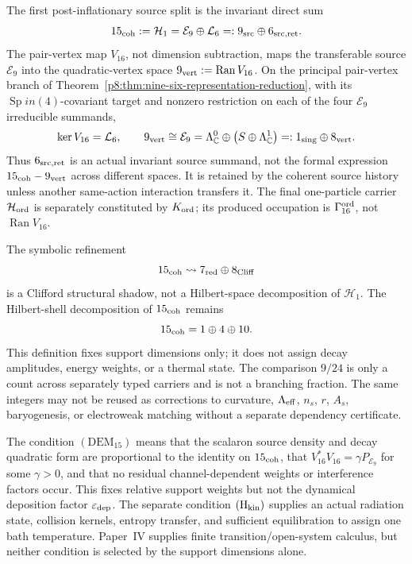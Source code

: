 \documentclass[12pt,a4paper]{article}
\begin{document}
\begin{definition}
\label{p8:def:typed-first-split-carrier}
The first post-inflationary source split is the invariant direct sum
\begin{equation}
 \label{p8:eq:typed-first-split-carrier}
 15_{\rm coh}:=\mathcal H_1
 =\mathcal E_9\oplus\mathcal L_6
 =:9_{\rm src}\oplus6_{\rm src,ret}.
\end{equation}
The pair-vertex map \(V_{16}\), not dimension subtraction, maps the
transferable source \(\mathcal E_9\) into the quadratic-vertex space
\(9_{\rm vert}:=\operatorname{Ran}V_{16}\).  On the principal pair-vertex branch of
Theorem~\ref{p8:thm:nine-six-representation-reduction}, with its
\(\operatorname{Sp}in(4)\)-covariant target and nonzero restriction
on each of the four \(\mathcal E_9\) irreducible summands,
\[
 \ker V_{16}=\mathcal L_6,
 \qquad
 9_{\rm vert}\cong\mathcal E_9
 =\Lambda^0_{\mathbb C}\oplus
   \bigl(S\oplus\Lambda^1_{\mathbb C}\bigr)
 =:1_{\rm sing}\oplus8_{\rm vert}.
\]
Thus \(6_{\rm src,ret}\) is an actual invariant source summand, not the
formal expression \(15_{\rm coh}-9_{\rm vert}\) across different spaces.  It
is retained by the coherent source history unless another same-action
interaction transfers it.
The final one-particle carrier \(\mathcal H_{\rm ord}\) is separately
constituted by \(K_{\rm ord}\); its produced occupation is
\(\Gamma_{16}^{\rm ord}\), not \(\operatorname{Ran}V_{16}\).

The symbolic refinement
\[
15_{\rm coh}\leadsto 7_{\rm red}\oplus8_{\rm Cliff}
\]
is a Clifford structural shadow, not a Hilbert-space decomposition of
\(\mathcal H_1\).  The Hilbert-shell decomposition of \(15_{\rm coh}\) remains
\[
15_{\rm coh}=1\oplus4\oplus10.
\]
This definition fixes support dimensions only; it does not assign decay
amplitudes, energy weights, or a thermal state.  The comparison \(9/24\) is
only a count across separately typed carriers and is not a branching fraction.
The same
integers may not be reused as corrections to curvature, \(\Lambda_{\rm eff}\),
\(n_s\), \(r\), \(A_s\), baryogenesis, or electroweak matching without a
separate dependency certificate.
\end{definition}

\begin{definition}
\label{p8:def:first-split-democratic-kinetic-interfaces}
The condition \((\mathrm{DEM}_{15})\) means that the scalaron source density
and decay quadratic form are proportional to the identity on
\(15_{\rm coh}\), that
\(V_{16}^*V_{16}=\gamma P_{\mathcal E_9}\) for some \(\gamma>0\), and that
no residual channel-dependent weights or interference factors occur.  This
fixes relative support weights but not the dynamical deposition factor
\(\varepsilon_{\rm dep}\).  The separate
condition \((\mathrm H_{\rm kin})\) supplies an actual radiation state,
collision kernels, entropy transfer, and sufficient equilibration to assign
one bath temperature.  Paper~IV supplies finite transition/open-system
calculus, but neither condition is selected by the support dimensions alone.
\end{definition}
\end{document}
